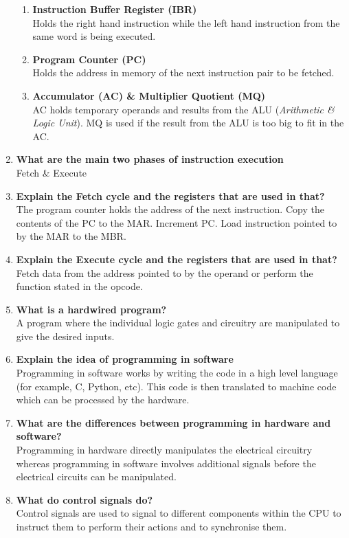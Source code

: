 \begin{enumerate}
\begin{enumerate}
        \item \textbf{Instruction Buffer Register (IBR)}\\
        Holds the right hand instruction while the left hand instruction from the same word is being executed.
        \item \textbf{Program Counter (PC)}\\
        Holds the address in memory of the next instruction pair to be fetched.
        \item \textbf{Accumulator (AC) \& Multiplier Quotient (MQ)}\\
        AC holds temporary operands and results from the ALU (\textit{Arithmetic \& Logic Unit}). MQ is used if the result from the ALU is too big to fit in the AC.
    \end{enumerate}
    \item \textbf{What are the main two phases of instruction execution}\\
    Fetch \& Execute
    \item \textbf{Explain the Fetch cycle and the registers that are used in that?}\\
    The program counter holds the address of the next instruction. Copy the contents of the PC to the MAR. Increment PC. Load instruction pointed to by the MAR to the MBR.
    \item \textbf{Explain the Execute cycle and the registers that are used in that?}\\
    Fetch data from the address pointed to by the operand or perform the function stated in the opcode.
    \item \textbf{What is a hardwired program?}\\
    A program where the individual logic gates and circuitry are manipulated to give the desired inputs.
    \item \textbf{Explain the idea of programming in software}\\
    Programming in software works by writing the code in a high level language (for example, C, Python, etc). This code is then translated to machine code which can be processed by the hardware.
    \item \textbf{What are the differences between programming in hardware and software?}\\
    Programming in hardware directly manipulates the electrical circuitry whereas programming in software involves additional signals before the electrical circuits can be manipulated.
    \item \textbf{What do control signals do?}\\
    Control signals are used to signal to different components within the CPU to instruct them to perform their actions and to synchronise them.
    \end{enumerate}